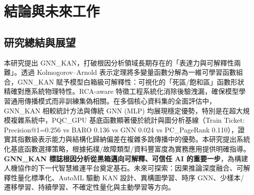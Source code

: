 \documentclass[10pt,a4paper,twocolumn]{article}
\begin{document}
\section{結論與未來工作}

\subsection{研究總結與展望}

本研究提出 GNN\_KAN，打破根因分析領域長期存在的「表達力與可解釋性兩難」。透過 Kolmogorov–Arnold 表示定理將多變量函數分解為一維可學習函數組合，GNN\_KAN 賦予模型白箱級可解釋性：可視化的「死區/飽和區」函數形狀精確對應系統物理特性。RCA-aware 特徵工程系統化消除後驗洩漏，確保模型學習通用傳播模式而非訓練集偽相關。在多個核心資料集的全面評估中，GNN\_KAN 相較統計方法與傳統 GNN (MLP) 均展現穩定優勢，特別是在超大規模複雜系統中，PQC\_GPU 基底函數顯著優於統計與圖分析基線（Train Ticket: Precision@1=0.256 vs BARO 0.136 vs GNN 0.024 vs PC\_PageRank 0.110），證實其指數級表示能力與結構化歸納偏差在複雜多跳傳播中的優勢。本研究提出系統化基底函數選擇策略，根據拓樸/故障類型/資料豐富度為實務應用提供明確指導。\textbf{GNN\_KAN 標誌根因分析從黑箱邁向可解釋、可信任 AI 的重要一步}，為構建人機協作的下一代智慧維運平台奠定基石。未來可探索：因果推論深度融合、可解釋性量化標準化、AutoML 驅動 KAN 設計、異構圖學習、時序 GNN、少樣本/遷移學習、持續學習、不確定性量化與主動學習等方向。
\end{document}
